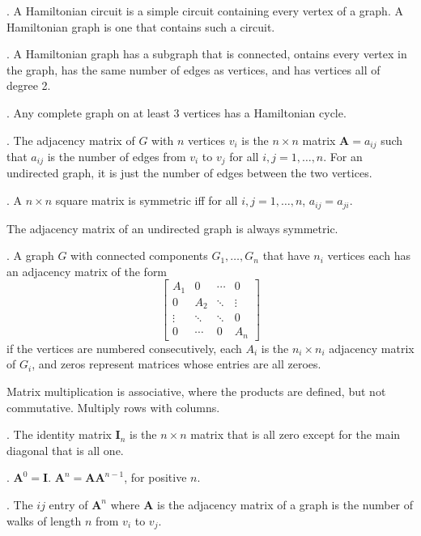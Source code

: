 \documentclass{slnotes}
\begin{document}
. A Hamiltonian circuit is a simple circuit containing every vertex of a graph. A Hamiltonian graph is one that contains such a circuit.

. A Hamiltonian graph has a subgraph that is connected, ontains every vertex in the graph, has the same number of edges as vertices, and has vertices all of degree 2.

. Any complete graph on at least 3 vertices has a Hamiltonian cycle.

. The adjacency matrix of \(G\) with \(n\) vertices \(v_i\) is the \(n \times n\) matrix \(\mathbf{A} = a_{ij}\) such that \(a_{ij}\) is the number of edges from \(v_i\) to \(v_j\) for all \(i, j = 1, \hdots, n\). For an undirected graph, it is just the number of edges between the two vertices.

. A \(n \times n\) square matrix is symmetric iff for all \(i, j = 1, \hdots, n\), \(a_{ij} = a_{ji}\).

The adjacency matrix of an undirected graph is always symmetric.

. A graph \(G\) with connected components \(G_1, \hdots, G_n\) that have \(n_i\) vertices each has an adjacency matrix of the form \[\begin{bmatrix}
A_1 & 0 & \cdots & 0 \\
0 & A_2 & \ddots & \vdots \\
\vdots & \ddots & \ddots & 0 \\
0 & \cdots & 0 & A_n
\end{bmatrix}\] if the vertices are numbered consecutively, each \(A_i\) is the \(n_i \times n_i\) adjacency matrix of \(G_i\), and zeros represent matrices whose entries are all zeroes.

Matrix multiplication is associative, where the products are defined, but not commutative. Multiply rows with columns.

. The identity matrix \(\mathbf{I}_n\) is the \(n \times n\) matrix that is all zero except for the main diagonal that is all one.

. \(\mathbf{A}^0 = \mathbf{I}\). \(\mathbf{A}^n = \mathbf{AA}^{n-1}\), for positive \(n\).

. The \(ij\) entry of \(\mathbf{A}^n\) where \(\mathbf{A}\) is the adjacency matrix of a graph is the number of walks of length \(n\) from \(v_i\) to \(v_j\).
\end{document}
